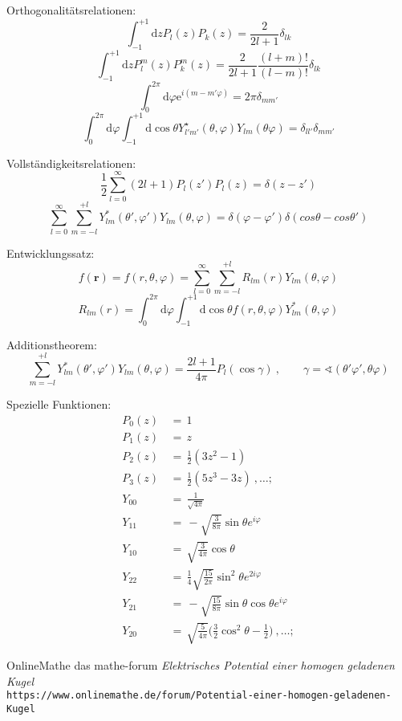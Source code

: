 \documentclass[titlepage,11pt,a4paper,ngerman]{report}
\newcommand{\vphi}{\varphi}
\newcommand{\dd}{\mathrm{d}}
\renewcommand{\vec}[1]{\bm{#1}}
\begin{document}
\noindent
Orthogonalitätsrelationen:
\[\int_{-1}^{+1}\dd zP_l(z)P_k(z)=\frac{2}{2l+1}\delta_{lk}\]
\[\int_{-1}^{+1}\dd zP_l^m(z)P_k^m(z)=\frac{2}{2l+1}\frac{(l+m)!}{(l-m)!}\delta_{lk}\]
\[\int_0^{2\pi}\dd\vphi \mathrm{e}^{i(m-m'\vphi)}=2\pi\delta_{mm'}\]
\[\int_0^{2\pi}\dd\varphi\int_{-1}^{+1}\dd\cos\theta Y_{l'm'}^\star(\theta,\vphi)Y_{lm}(\theta\vphi)=\delta_{ll'}\delta_{mm'}\]

\noindent
Vollständigkeitsrelationen:
\[\frac{1}{2}\sum_{l=0}^\infty(2l+1)P_l(z')P_l(z)=\delta(z-z')\]
\[\sum_{l=0}^{\infty}\sum_{m=-l}^{+l}Y_{lm}^*(\theta',\varphi')Y_{lm}(\theta,\varphi)=\delta(\varphi-\varphi')\delta(cos\theta-cos\theta')\]

\noindent
Entwicklungssatz:
\[f(\vec{r})=f(r,\theta,\varphi)=\sum_{l=0}^{\infty}\sum_{m=-l}^{+l}R_{lm}(r)Y_{lm}(\theta,\varphi)\]
\[R_{lm}(r)=\int_0^{2\pi}\dd\varphi\int_{-1}^{+1}\dd \cos\theta f(r,\theta,\varphi)Y_{lm}^*(\theta,\varphi)\]

\noindent
Additionstheorem:
\[\sum_{m=-l}^{+l}Y_{lm}^*(\theta',\varphi')Y_{lm}(\theta,\varphi)=\frac{2l+1}{4\pi}P_l(\cos\gamma)\ ,\qquad\gamma=\sphericalangle(\theta'\varphi',\theta\varphi)\]

\noindent
Spezielle Funktionen:
\begin{align*}
P_0(z)\,&=\,1\\
P_1(z)\,&=\,z\\
P_2(z)\,&=\,\frac{1}{2}(3z^2-1)\\
P_3(z)\,&=\,\frac{1}{2}(5z^3-3z)\ ,\dots;\\
Y_{00}\,&=\,\frac{1}{\sqrt{4\pi}}\\
Y_{11}\,&=\,-\sqrt{\frac{3}{8\pi}}\sin\theta e^{i\varphi}\\
Y_{10}\,&=\,\sqrt{\frac{3}{4\pi}}\cos\theta\\
Y_{22}\,&=\,\frac{1}{4}\sqrt{\frac{15}{2\pi}}\sin^2\theta e^{2i\varphi}\\
Y_{21}\,&=\,-\sqrt{\frac{15}{8\pi}}\sin\theta\cos\theta e^{i\varphi}\\
Y_{20}\,&=\,\sqrt{\frac{5}{4\pi}}\Bigg(\frac{3}{2}\cos^2\theta-\frac{1}{2}\Bigg)\ ,\dots;
\end{align*}

\begin{thebibliography}{9}
OnlineMathe das mathe-forum
\textit{Elektrisches Potential einer homogen geladenen Kugel}
\\\texttt{https://www.onlinemathe.de/forum/Potential-einer-homogen-geladenen-Kugel}
\end{thebibliography}
\end{document}
